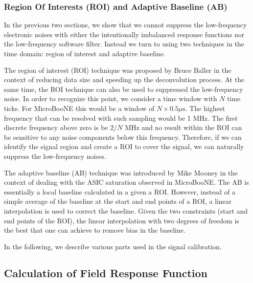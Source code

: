 \subsubsection{Region Of Interests (ROI) and Adaptive Baseline (AB)}\label{sec:roi_ab}

In the previous two sections, we show that we cannot suppress the low-frequency 
electronic noises with either the intentionally imbalanced response functions nor 
the low-frequency software filter. 
Instead we turn to using two techniques in the time domain: region of interest and 
adaptive baseline. 

The region of interest (ROI) technique
was proposed by Bruce Baller in the context of reducing data size and speeding up the 
deconvolution process. At the same time, the ROI technique can also be used to 
suppressed the low-frequency noise. In order to recognize this point, we consider
a time window with $N$ time ticks.  For MicroBooNE this would be a window of $N\times0.5\mu\mbox{s}$.
The highest frequency that can be resolved with such sampling would be 
1 MHz. The first discrete frequency above zero is be $2/N$ MHz and no result
within the ROI can be sensitive 
to any noise components below this frequency.  Therefore, if we can identify 
the signal region and create a ROI to cover the signal, we can naturally suppress 
the low-frequency noises. 

The adaptive baseline (AB) technique was introduced by 
Mike Mooney in the context of dealing with the ASIC saturation observed in MicroBooNE.
The AB is essentially a local baseline calculated in a given a ROI. However, instead of 
a simple average of the baseline at the start and end points of a ROI, a linear
interpolation is used to correct the baseline. Given the two constraints (start and 
end points of the ROI), the linear interpolation with two degrees of freedom is the best 
that one can achieve to  remove bias in the baseline. 



In the following, we describe various parts used in the signal calibration.

\subsection{Calculation of Field Response Function}

